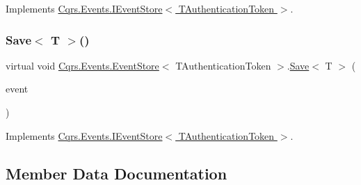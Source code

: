 Implements \hyperlink{interfaceCqrs_1_1Events_1_1IEventStore_a81fb586703e7c6dea6b23d9a95f3887a_a81fb586703e7c6dea6b23d9a95f3887a}{Cqrs.\+Events.\+I\+Event\+Store$<$ T\+Authentication\+Token $>$}.

\mbox{\label{classCqrs_1_1Events_1_1EventStore_a958854f49c3eb4fcf1922ba7737a8dfe_a958854f49c3eb4fcf1922ba7737a8dfe}} 
\subsubsection{\texorpdfstring{Save$<$ T $>$()}{Save< T >()}}
{\footnotesize\ttfamily virtual void \hyperlink{classCqrs_1_1Events_1_1EventStore}{Cqrs.\+Events.\+Event\+Store}$<$ T\+Authentication\+Token $>$.\hyperlink{classCqrs_1_1Events_1_1EventStore_a3ba5ba04a36382b6d36a6ad8867dc766_a3ba5ba04a36382b6d36a6ad8867dc766}{Save}$<$ T $>$ (\begin{DoxyParamCaption}\item[{\hyperlink{interfaceCqrs_1_1Events_1_1IEvent}{I\+Event}$<$ T\+Authentication\+Token $>$ @}]{event }\end{DoxyParamCaption})\hspace{0.3cm}{\ttfamily [virtual]}}



Implements \hyperlink{interfaceCqrs_1_1Events_1_1IEventStore_a92e768243d6602d09b786bbd06811ce6_a92e768243d6602d09b786bbd06811ce6}{Cqrs.\+Events.\+I\+Event\+Store$<$ T\+Authentication\+Token $>$}.



\subsection{Member Data Documentation}
\mbox{\label{classCqrs_1_1Events_1_1EventStore_a1e6d87995d38d6fbb148388ec165a87e_a1e6d87995d38d6fbb148388ec165a87e}} 
